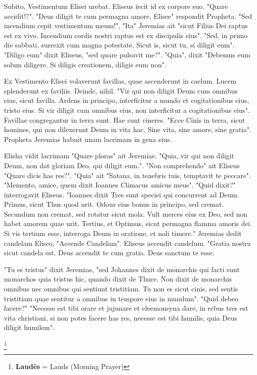 Subito, Vestimentum Elisei urebat. Eliseus iecit id ex corpore suo. "Quare accidit!?". "Deus diligit te cum permagna amore, Elisee" respondit Propheta. "Sed incendium cepit vestimentum meum!", "Ita" Jeremias ait "sicut Filius Dei raptus est ex vivo. Incendium cordis nostri raptus est ex discipulis eius". "Sed, in primo die sabbati, surrexit cum magna potestate. Sicut is, sicut tu, si diligit eum". "Diligo eum" dixit Eliseus, "sed quare pulsavit me?". "Quia", dixit "Debemus eum solum diligere. Si diligis creationem, diligis eum non". \par 
Ex Vestimento Elisei volaverunt favillas, quae ascenderunt in caelum. Lucem splenderunt ex faviliis. Deinde, nihil. "Vir qui non diligit Deum cum omnibus eius, sicut favilla. Ardens in principo, interficitur a mundo et cogitationibus eius, tristo eius. Si vir diligit cum omnibus eius, non interficitur a cogitationibus eius". Favillae congregantur in terra sunt. Hae sunt cineres. "Ecce Cinis in terra, sicut homines, qui non dilexerunt Deum in vita hac. Sine vita, sine amore, sine gratia". Propheta Jeremias habuit unam lacrimam in gena eius. \par 
Elisha vidit lacrimam "Quare ploras" ait Jeremiae. "Quia, vir qui non diligit Deum, non dat gloriam Deo, qui diligit eum.". "Non comprehendo" ait Eliseus "Quare dicis has res?". "Quia" ait "Satana, in tenebris tuis, temptavit te peccare". "Memento, amice, quem dixit Ioannes Climacus amicus meus". "Quid dixit?" interrogavit Eliseus. "Ioannes dixit \: Tres sunt speciei qui concurrent ad Deum. Primus, sicut Thus quod urit. Odour eius bonus in principo, sed cremat. Secundum non cremat, sed rotatur sicut mola. Vult merces eius ex Deo, sed non habet amorem quae urit. Tertius, et Optimus, sicut permagna flamma amoris dei. Si vis tertium esse, interroga Deum in oratione, et noli timere." Jeremias dedit candelam Eliseo, "Accende Candelam". Eliseus accendit candelum. "Gratia nostra sicut candela est. Deus accendit te cum gratia. Deus sanctum te esse. 


"Tu es tristus" dixit Jeremias, "sed Johannes dixit de monarchis qui facti sunt monarchos quia tristus hic, quando dixit de Thure. Non dixit de monarchis omnibus nec omnibus qui sentiunt tristitiam. Tu non es sicut cinis, sed sentis tristitiam quae sentitur a omnibus in tempore eius in mundum". "Quid debeo facere?" "Necesse est tibi orare et jujunare et eleemonsyna dare, in rebus tres est vita christiani, si non potes facere has res, necesse est tibi humilis, quia Deus diligit humilem".

\footnote{\textbf{Laudēs} = Lauds (Morning Prayer)}

